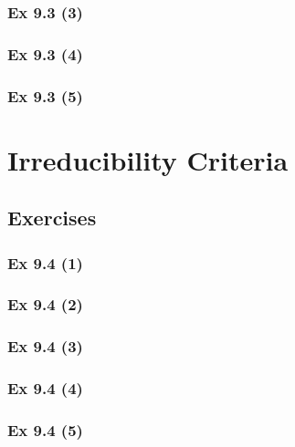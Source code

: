 \subsubsection{Ex 9.3 (3)}\label{sec:Ex_9.3.3}

\subsubsection{Ex 9.3 (4)}\label{sec:Ex_9.3.4}

\subsubsection{Ex 9.3 (5)}\label{sec:Ex_9.3.5}

\newpage		%

\section{Irreducibility Criteria}\label{sec:9.4}	
\subsection*{Exercises}\label{sec:9.4_Exercises}

\subsubsection{Ex 9.4 (1)}\label{sec:Ex_9.4.1}

\subsubsection{Ex 9.4 (2)}\label{sec:Ex_9.4.2}

\subsubsection{Ex 9.4 (3)}\label{sec:Ex_9.4.3}

\subsubsection{Ex 9.4 (4)}\label{sec:Ex_9.4.4}

\subsubsection{Ex 9.4 (5)}\label{sec:Ex_9.4.5}

